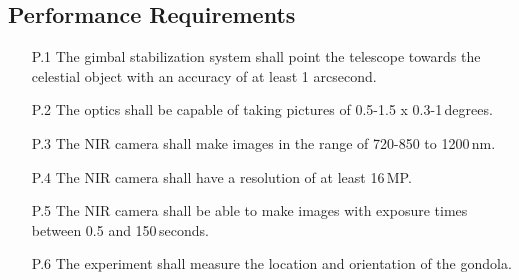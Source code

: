 \subsection{Performance Requirements}

\begin{enumerate}
    \item[P.1] The gimbal stabilization system shall point the telescope towards the celestial object with an accuracy of at least 1 arcsecond.
    \item[P.2] The optics shall be capable of taking pictures of 0.5-1.5 x 0.3-1\,degrees.
    \item[P.3] The NIR camera shall make images in the range of 720-850 to 1200\,nm.
    \item[P.4] The NIR camera shall have a resolution of at least 16\,MP.
    \item[P.5] The NIR camera shall be able to make images with exposure times between 0.5 and 150\,seconds.
    \item[P.6] The experiment shall measure the location and orientation of the gondola.
\end{enumerate}